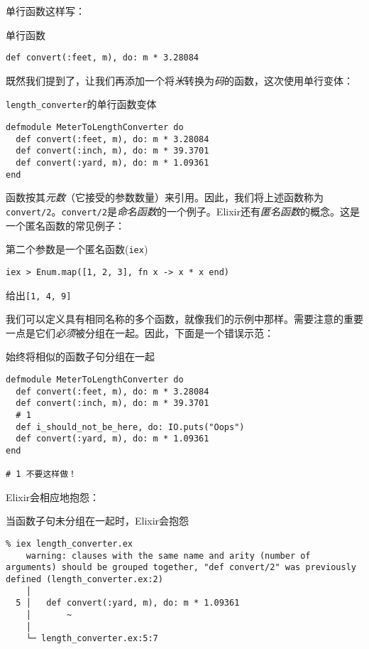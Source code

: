 单行函数这样写：

\begin{code}{单行函数}
\begin{verbatim}
def convert(:feet, m), do: m * 3.28084
\end{verbatim}
\label{lst:single_line_function}
\end{code}

既然我们提到了，让我们再添加一个将\emph{米}转换为\emph{码}的函数，这次使用单行变体：

\begin{code}{\texttt{length\_converter}的单行函数变体}
\begin{verbatim}
defmodule MeterToLengthConverter do
  def convert(:feet, m), do: m * 3.28084
  def convert(:inch, m), do: m * 39.3701
  def convert(:yard, m), do: m * 1.09361
end
\end{verbatim}
\label{lst:length_converter_single_line_function_variant}
\end{code}

函数按其\emph{元数}（它接受的参数数量）来引用。因此，我们将上述函数称为\texttt{convert/2}。\texttt{convert/2}是\emph{命名函数}的一个例子。Elixir还有\emph{匿名函数}的概念。这是一个匿名函数的常见例子：

\begin{code}{第二个参数是一个匿名函数(\texttt{iex})}
\begin{verbatim}
iex > Enum.map([1, 2, 3], fn x -> x * x end)
\end{verbatim}
\label{lst:second_argument_is_an_anonymous_function}
\end{code}

给出\texttt{[1, 4, 9]}

我们可以定义具有相同名称的多个函数，就像我们的示例中那样。需要注意的重要一点是它们\emph{必须}被分组在一起。因此，下面是一个错误示范：

\begin{code}{始终将相似的函数子句分组在一起}
\begin{verbatim}
defmodule MeterToLengthConverter do
  def convert(:feet, m), do: m * 3.28084
  def convert(:inch, m), do: m * 39.3701
  # 1
  def i_should_not_be_here, do: IO.puts("Oops")
  def convert(:yard, m), do: m * 1.09361
end

# 1 不要这样做！
\end{verbatim}
\label{lst:always_group_similar_function_clauses}
\end{code}


Elixir会相应地抱怨：
\begin{code}{当函数子句未分组在一起时，Elixir会抱怨}
\begin{verbatim}
% iex length_converter.ex
    warning: clauses with the same name and arity (number of arguments) should be grouped together, "def convert/2" was previously defined (length_converter.ex:2)
    │
  5 │   def convert(:yard, m), do: m * 1.09361
    │       ~
    │
    └─ length_converter.ex:5:7
\end{verbatim}
\label{lst:elixir_complains_when_function_clauses_are_not_grouped_together}
\end{code}

